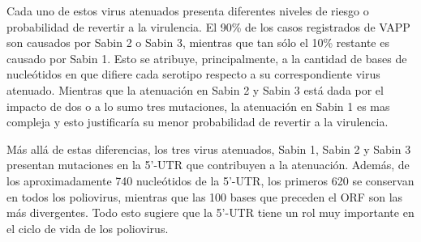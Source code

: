 Cada uno de estos virus atenuados presenta diferentes niveles de riesgo o
probabilidad de revertir a la virulencia. El 90\% de los casos registrados de
\ac{VAPP} son causados por Sabin 2 o Sabin 3, mientras que tan s\'olo el 10\%
restante es causado por Sabin 1\cite{Philip92}. Esto se atribuye,
principalmente, a la cantidad de bases de nucle\'otidos en que difiere cada
serotipo respecto a su correspondiente virus atenuado. Mientras que la
atenuaci\'on en Sabin 2 y Sabin 3 est\'a dada por el impacto de dos
o a lo sumo tres mutaciones, la atenuaci\'on en Sabin 1 es mas compleja y esto
justificar\'ia su menor probabilidad de revertir a la virulencia\cite{Philip92}.

M\'as all\'a de estas diferencias, los tres virus atenuados, Sabin 1, Sabin 2 y
Sabin 3 presentan mutaciones en la 5'-\ac{UTR} que contribuyen a la
atenuaci\'on. Adem\'as, de los aproximadamente 740 nucle\'otidos de la
5'-\ac{UTR}, los primeros 620 se conservan en todos los poliovirus, mientras que
las 100 bases que preceden el \ac{ORF} son las m\'as divergentes. Todo esto
sugiere que la 5'-\ac{UTR} tiene un rol muy importante en el ciclo de vida de
los poliovirus\cite{Philip92}.

